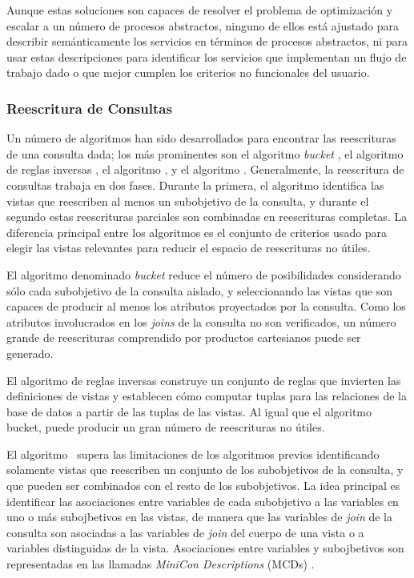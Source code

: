 Aunque estas soluciones son capaces de resolver el problema de optimización y
escalar a un número de procesos abstractos, ninguno de ellos está ajustado para
describir semánticamente los servicios en términos de procesos abstractos, ni
para usar estas descripciones para identificar los servicios que implementan un
flujo de trabajo dado o que mejor cumplen los criterios no funcionales del
usuario.

\subsubsection{Reescritura de Consultas}

Un número de algoritmos han sido desarrollados para encontrar las reescrituras
de una consulta dada; los más prominentes son el algoritmo \emph{bucket} \cite{levy:bucket}, el
algoritmo de reglas inversas \cite{pods:DuschkaG97,Qian96}, el algoritmo
\minicon \cite{pottinger:minicon}, y el
algoritmo \mcdsat \cite{arvelo:aaai06}. Generalmente, la reescritura de consultas trabaja en
dos fases. Durante la primera, el algoritmo identifica las vistas que reescriben
al menos un subobjetivo de la consulta, y durante el segundo estas reescrituras
parciales son combinadas en reescrituras completas. La diferencia principal
entre los algoritmos es el conjunto de criterios usado para elegir las vistas
relevantes para reducir el espacio de reescrituras no útiles.

El algoritmo denominado \emph{bucket} reduce el número de posibilidades considerando sólo cada
subobjetivo de la consulta aislado, y seleccionando las vistas que son capaces
de producir al menos los atributos proyectados por la consulta. Como los
atributos involucrados en los \emph{joins} de la consulta no son verificados, un número
grande de reescrituras comprendido por productos cartesianos puede ser generado.

El algoritmo de reglas inversas construye un conjunto de reglas que invierten
las definiciones de vistas y establecen cómo computar tuplas para las relaciones
de la base de datos a partir de las tuplas de las vistas. Al igual que el algoritmo
bucket, puede producir un gran número de reescrituras no útiles.

El algoritmo \minicon\ supera las limitaciones de los algoritmos previos
identificando solamente vistas que reescriben un conjunto de los subobjetivos de
la consulta, y que pueden ser combinados con el resto de los subobjetivos. La
idea principal es identificar las asociaciones entre variables de cada
subobjetivo a las variables en uno o más subojbetivos en las vistas, de manera
que las variables de \emph{join} de la consulta son asociadas a las variables de
\emph{join}
del cuerpo de una vista o a variables distinguidas de la vista. Asociaciones
entre variables y subojbetivos son representadas en las llamadas \emph{MiniCon
Descriptions} (MCDs) \cite{pottinger:minicon}.

